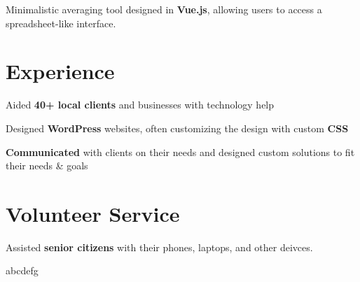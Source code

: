 \documentclass[letterpaper]{deedy-resume} %
\begin{document}
\begin{minipage}[t]{0.66\textwidth}
\sectionspace %


Minimalistic averaging tool designed in \textbf{Vue.js}, allowing users to access a spreadsheet-like interface.

\sectionspace %


\section{Experience}


\vspace{\topsep} %
\begin{tightitemize}
\item Aided \textbf{40+ local clients} and businesses with technology help
\item Designed \textbf{WordPress} websites, often customizing the design with custom \textbf{CSS}
\item \textbf{Communicated} with clients on their needs and designed custom solutions to fit their needs \& goals
\end{tightitemize}

\sectionspace %


\section{Volunteer Service}


\begin{tightitemize}
\item Assisted \textbf{senior citizens} with their phones, laptops, and other deivces.
\item abcdefg
\end{tightitemize}


\end{minipage}
\end{document}
